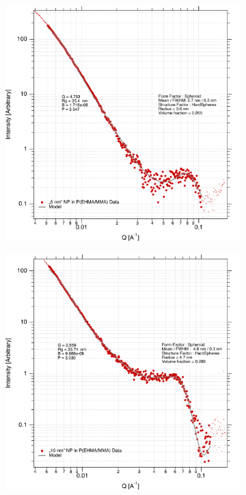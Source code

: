 \begin{figure}[tp]
	\centering
	\begin{subfigure}[b]{0.3\textwidth}
		\includegraphics[width=\linewidth]{images/pmma5.pdf}
	\end{subfigure}
	\begin{subfigure}[b]{0.3\textwidth}
		\includegraphics[width=\linewidth]{images/pmma10.pdf}

\end{subfigure}
\end{figure}
